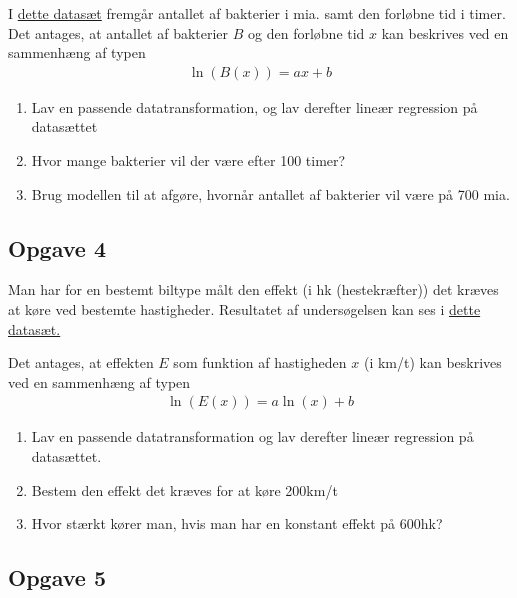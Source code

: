 I \href{https://github.com/ChristianJLex/TeachingNotes/raw/master/2023-2024/Data%20og%20lign/Bakteriedata.xlsx}{\color{blue!60}dette datasæt} fremgår antallet af bakterier i mia. samt den forløbne tid i timer.
Det antages, at antallet af bakterier $B$ og den forløbne tid $x$ kan beskrives ved en sammenhæng af typen
\begin{align*}
	\ln(B(x)) = ax + b
\end{align*}
\begin{enumerate}[label=\roman*)]
	\item Lav en passende datatransformation, og lav derefter lineær regression på datasættet
	\item Hvor mange bakterier vil der være efter 100 timer?
	\item Brug modellen til at afgøre, hvornår antallet af bakterier vil være på 700 mia.
\end{enumerate}

\subsection*{Opgave 4}

Man har for en bestemt biltype målt den effekt (i hk (hestekræfter)) det kræves at køre ved bestemte hastigheder. Resultatet af undersøgelsen kan ses i \href{https://github.com/ChristianJLex/TeachingNotes/raw/master/2023-2024/Data og lign/hk.xlsx}{\color{blue!60}dette datasæt.}

Det antages, at effekten $E$ som funktion af hastigheden $x$ (i km/t) kan beskrives ved en sammenhæng af typen
\begin{align*}
	\ln(E(x)) = a\ln(x) + b
\end{align*}

\begin{enumerate}[label=\roman*)]
	\item Lav en passende datatransformation og lav derefter lineær regression på datasættet.
	\item Bestem den effekt det kræves for at køre 200km/t
	\item Hvor stærkt kører man, hvis man har en konstant effekt på 600hk?
\end{enumerate}

\subsection*{Opgave 5}

